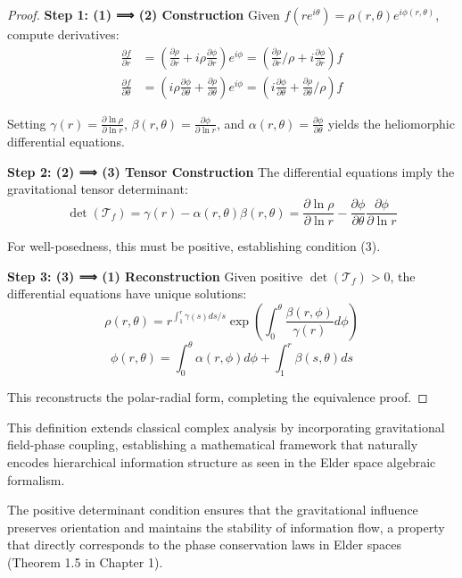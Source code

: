 \begin{proof}
\textbf{Step 1: (1) ⟹ (2) Construction}
Given $f(re^{i\theta}) = \rho(r,\theta)e^{i\phi(r,\theta)}$, compute derivatives:
\begin{align}
\frac{\partial f}{\partial r} &= \left(\frac{\partial \rho}{\partial r} + i\rho\frac{\partial \phi}{\partial r}\right)e^{i\phi} = \left(\frac{\partial \rho}{\partial r}/\rho + i\frac{\partial \phi}{\partial r}\right)f\\
\frac{\partial f}{\partial \theta} &= \left(i\rho\frac{\partial \phi}{\partial \theta} + \frac{\partial \rho}{\partial \theta}\right)e^{i\phi} = \left(i\frac{\partial \phi}{\partial \theta} + \frac{\partial \rho}{\partial \theta}/\rho\right)f
\end{align}

Setting $\gamma(r) = \frac{\partial \ln \rho}{\partial \ln r}$, $\beta(r,\theta) = \frac{\partial \phi}{\partial \ln r}$, and $\alpha(r,\theta) = \frac{\partial \phi}{\partial \theta}$ yields the heliomorphic differential equations.

\textbf{Step 2: (2) ⟹ (3) Tensor Construction}
The differential equations imply the gravitational tensor determinant:
$$\det(\mathcal{T}_f) = \gamma(r) - \alpha(r,\theta)\beta(r,\theta) = \frac{\partial \ln \rho}{\partial \ln r} - \frac{\partial \phi}{\partial \theta}\frac{\partial \phi}{\partial \ln r}$$

For well-posedness, this must be positive, establishing condition (3).

\textbf{Step 3: (3) ⟹ (1) Reconstruction}
Given positive $\det(\mathcal{T}_f) > 0$, the differential equations have unique solutions:
$$\rho(r,\theta) = r^{\int_1^r \gamma(s)ds/s} \exp\left(\int_0^\theta \frac{\beta(r,\phi)}{\gamma(r)} d\phi\right)$$
$$\phi(r,\theta) = \int_0^\theta \alpha(r,\phi) d\phi + \int_1^r \beta(s,\theta) ds$$

This reconstructs the polar-radial form, completing the equivalence proof.
\end{proof}

This definition extends classical complex analysis by incorporating gravitational field-phase coupling, establishing a mathematical framework that naturally encodes hierarchical information structure as seen in the Elder space algebraic formalism.



\begin{remark}
The positive determinant condition ensures that the gravitational influence preserves orientation and maintains the stability of information flow, a property that directly corresponds to the phase conservation laws in Elder spaces (Theorem 1.5 in Chapter 1).
\end{remark}

